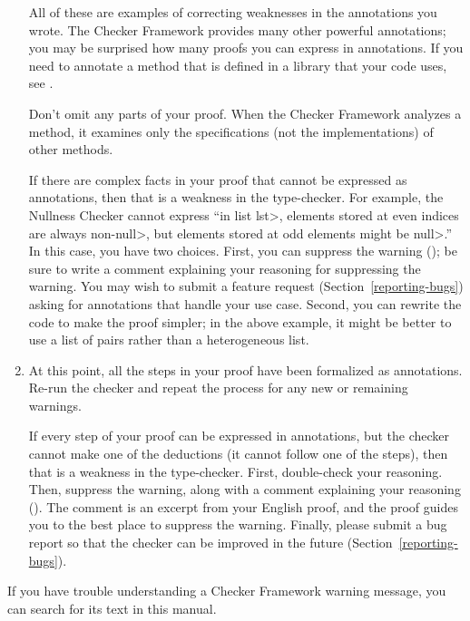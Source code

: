 \begin{enumerate}
  All of these are examples of correcting weaknesses in the annotations you wrote.
  The Checker Framework provides many other powerful annotations; you may
  be surprised how many proofs you can express in annotations.
  If you need to annotate a method that is defined in a
  library that your code uses, see .

  Don't omit any parts of your proof.  When the Checker Framework analyzes
  a method, it examines only the specifications (not the implementations)
  of other methods.

  If there are complex facts in your proof that cannot be expressed as
  annotations, then that is a weakness in the type-checker.  For example,
  the Nullness Checker cannot express ``in list \<lst>, elements stored at
  even indices are always non-\<null>, but elements stored at odd elements
  might be \<null>.''  In this case, you have two choices.
  First, you can suppress the warning
  (); be sure to write a comment
  explaining your reasoning for suppressing the warning.  You may wish to
  submit a feature request (Section~\ref{reporting-bugs}) asking for
  annotations that handle your use case.
  Second, you can rewrite the code to make the proof simpler;
  in the above example, it might be better to use a list of pairs
  rather than a heterogeneous list.

\item
  At this point, all the steps in your proof have been formalized as
  annotations.  Re-run the checker and repeat the process for any new or
  remaining warnings.

  If every step of your proof can be expressed in annotations, but the
  checker cannot make one of the deductions (it cannot follow one of the
  steps), then that is a weakness in the type-checker.  First, double-check
  your reasoning.  Then, suppress the warning, along with a comment
  explaining your reasoning ().
  The comment is an excerpt from your English proof, and the proof guides
  you to the best place to suppress the warning.
  Finally, please submit a bug report so that the checker can be improved
  in the future (Section~\ref{reporting-bugs}).

\end{enumerate}

If you have trouble understanding a Checker Framework warning message, you
can search for its text in this manual.

